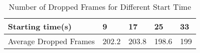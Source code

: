 \begin{table}[htb]
\centering
\caption{Number of Dropped Frames for Different Start Time}
\label{tab:drop-every-8}

\begin{tabular}{|l|l|l|l|l|}
\hline
Starting time(s)       & 9     & 17    & 25    & 33  \\ \hline
Average Dropped Frames & 202.2 & 203.8 & 198.6 & 199 \\ \hline
\end{tabular}
\end{table}